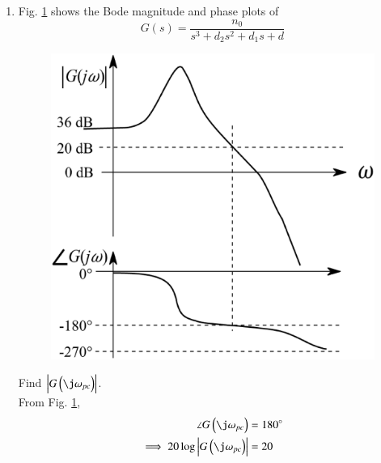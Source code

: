 \begin{enumerate}[label=\thesubsection.\arabic*.,ref=\thesubsection.\theenumi]


\item   Fig. \ref{fig:ee18btech11025} shows  the Bode magnitude and phase plots of 
    \begin{equation}  
            G(s) = \frac{n_0}{s^3 + d_2 s^2 + d_1 s + d}
    \end{equation}
\begin{figure}[ht!]
        \includegraphics[width=\columnwidth]{./figs/ee18btech11025/q42_1.eps}
        \caption{}
        \label{fig:ee18btech11025}
\end{figure}
Find  $\abs{G\brak{\j\omega_{pc}}}$.
\\
\solution From Fig. \ref{fig:ee18btech11025}, 
%
\begin{align}
\angle G\brak{\j\omega_{pc}}  &= 180 \degree
\\
\implies 20\log\abs{ G\brak{\j\omega_{pc}}}  &= 20
\label{ee18btech11025_g_gain}
%
\end{align}
%



\end{enumerate}
